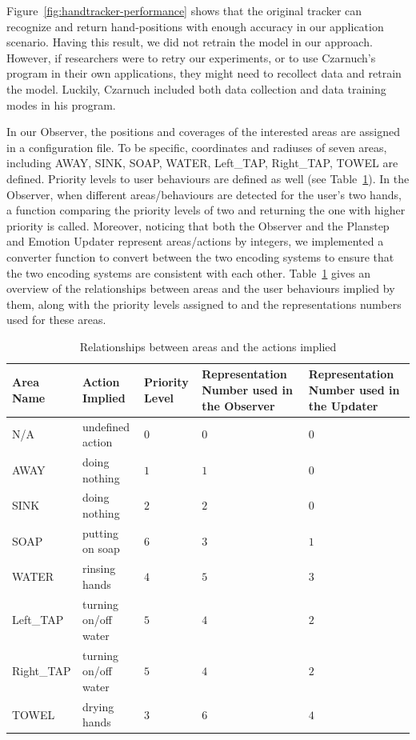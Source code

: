 Figure~\ref{fig:handtracker-performance} shows that the original tracker can recognize and return hand-positions with enough accuracy in our application scenario. Having this result, we did not retrain the model in our approach. However, if researchers were to retry our experiments, or to use Czarnuch's program in their own applications, they might need to recollect data and retrain the model. Luckily, Czarnuch included both data collection and data training modes in his program.

In our Observer, the positions and coverages of the interested areas are assigned in a configuration file. To be specific, coordinates and radiuses of seven areas, including AWAY, SINK, SOAP, WATER, Left\_TAP, Right\_TAP, TOWEL are defined. Priority levels to user behaviours are defined as well (see Table~\ref{table:area-action}). In the Observer, when different areas/behaviours are detected for the user's two hands, a function comparing the priority levels of two and returning the one with higher priority is called. Moreover, noticing that both the Observer and the Planstep and Emotion Updater represent areas/actions by integers, we implemented a converter function to convert between the two encoding systems to ensure that the two encoding systems are consistent with each other. Table~\ref{table:area-action} gives an overview of the relationships between areas and the user behaviours implied by them, along with the priority levels assigned to and the representations numbers used for these areas.

%
\begin{table}
\centering
\caption{Relationships between areas and the actions implied}
\label{table:area-action}
\begin{tabular}{| l | l | p{2cm} | p{3cm} | p{3cm} |}
\hline
Area Name & Action Implied & Priority Level & 
Representation Number used in the Observer  & Representation Number used in the Updater \\ \hline
N/A & undefined action & $0$ & $0$ & $0$ \\ \hline
AWAY & doing nothing & $1$ & $1$ & $0$ \\ \hline
SINK & doing nothing & $2$ & $2$ & $0$ \\ \hline
SOAP & putting on soap & $6$ & $3$ & $1$ \\ \hline
WATER & rinsing hands & $4$ & $5$ & $3$ \\ \hline
Left\_TAP & turning on/off water & $5$ & $4$ & $2$ \\ \hline
Right\_TAP & turning on/off water & $5$ & $4$ & $2$ \\ \hline
TOWEL & drying hands & $3$ & $6$ & $4$ \\ \hline
\end{tabular}
\end{table}

